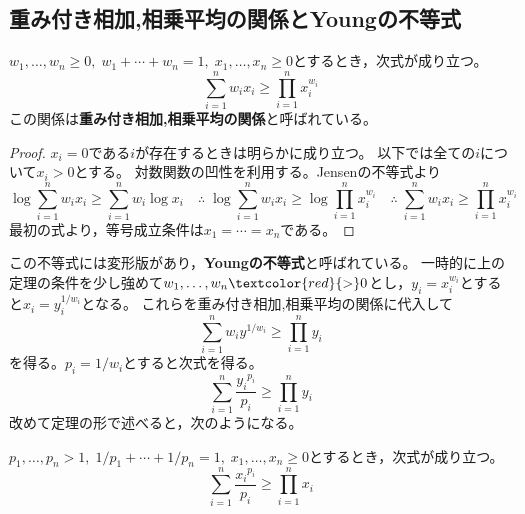         \subsection{重み付き相加,相乗平均の関係とYoungの不等式}
            \label{重み付き相加,相乗平均の関係とYoungの不等式}
            \begin{shadebox}
                $w_1,\dotsc,w_n\geq 0,\;w_1+\dotsb+w_n=1,\;x_1,\dotsc,x_n\geq 0$とするとき，次式が成り立つ。
                \[ \sum_{i=1}^n w_i x_i \geq \prod_{i=1}^n x_i^{w_i} \]
                この関係は\textbf{重み付き相加,相乗平均の関係}と呼ばれている。
            \end{shadebox}
            \begin{proof}
                \quad\par
                $x_i=0$である$i$が存在するときは明らかに成り立つ。
                以下では全ての$i$について$x_i>0$とする。
                対数関数の凹性を利用する。Jensenの不等式より
                \[ \log\sum_{i=1}^n w_i x_i \geq \sum_{i=1}^n w_i\log x_i \quad \therefore\; \log\sum_{i=1}^n w_i x_i \geq \log\prod_{i=1}^n x_i^{w_i} \quad \therefore\; \sum_{i=1}^n w_i x_i \geq \prod_{i=1}^n x_i^{w_i} \]
                最初の式より，等号成立条件は$x_1=\dotsb=x_n$である。
            \end{proof}
            この不等式には変形版があり，\textbf{Youngの不等式}と呼ばれている。
            一時的に上の定理の条件を少し強めて$w_1,\dotsc,w_n\textcolor{red}{>}0$とし，$y_i=x_i^{w_i}$とすると$x_i=y_i^{1/w_i}$となる。
            これらを重み付き相加,相乗平均の関係に代入して
            \[ \sum_{i=1}^n w_i y^{1/w_i} \geq \prod_{i=1}^n y_i \]
            を得る。$p_i=1/w_i$とすると次式を得る。
            \[ \sum_{i=1}^n \frac{{y_i}^{p_i}}{p_i} \geq \prod_{i=1}^n y_i \]
            改めて定理の形で述べると，次のようになる。\\
            \begin{shadebox}
                $p_1,\dotsc,p_n>1,\;1/p_1+\dotsb+1/p_n=1,\;x_1,\dotsc,x_n\geq 0$とするとき，次式が成り立つ。
                \[ \sum_{i=1}^n \frac{{x_i}^{p_i}}{p_i} \geq \prod_{i=1}^n x_i \]
            \end{shadebox}
